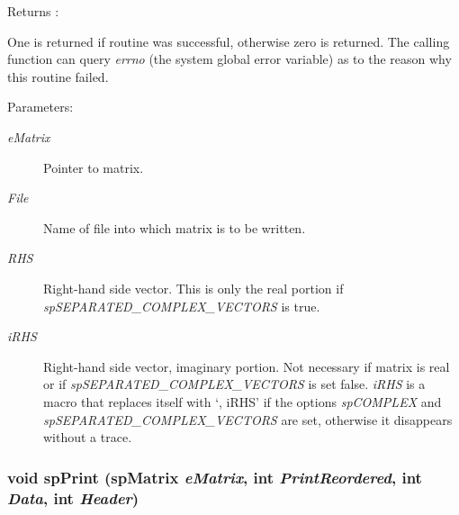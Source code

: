 \begin{Desc}
\item[Returns :]\par
 One is returned if routine was successful, otherwise zero is returned. The calling function can query {\em errno} (the system global error variable) as to the reason why this routine failed.\end{Desc}
\begin{Desc}
\item[Parameters: ]\par
\begin{description}
\item[{\em 
e\-Matrix}]Pointer to matrix. \item[{\em 
File}]Name of file into which matrix is to be written. \item[{\em 
RHS}]Right-hand side vector. This is only the real portion if {\em sp\-SEPARATED\_\-COMPLEX\_\-VECTORS} is true. \item[{\em 
i\-RHS}]Right-hand side vector, imaginary portion. Not necessary if matrix is real or if {\em sp\-SEPARATED\_\-COMPLEX\_\-VECTORS} is set false. {\em i\-RHS} is a macro that replaces itself with `, i\-RHS' if the options {\em sp\-COMPLEX} and {\em sp\-SEPARATED\_\-COMPLEX\_\-VECTORS} are set, otherwise it disappears without a trace. \end{description}
\end{Desc}
\subsubsection{\setlength{\rightskip}{0pt plus 5cm}void sp\-Print ({\bf sp\-Matrix} {\em e\-Matrix}, int {\em Print\-Reordered}, int {\em Data}, int {\em Header})}\label{spOutput_8c_a3}


